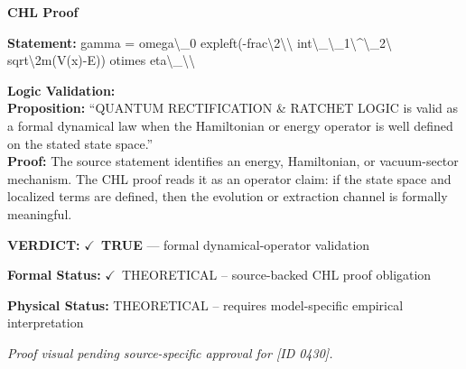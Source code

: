 \vspace{0.45em}
\noindent\textbf{CHL Proof}\par
\textbf{Statement:} gamma = omega\textbackslash{}\_0 expleft(-frac\textbackslash{}2\textbackslash{}\textbackslash{} int\textbackslash{}\_\textbackslash{}\_1\textbackslash{}\textasciicircum{}\textbackslash{}\_2\textbackslash{} sqrt\textbackslash{}2m(V(x)-E)) otimes eta\textbackslash{}\_\textbackslash{}\textbackslash{}

\textbf{Logic Validation:}\\
\textbf{Proposition:} ``QUANTUM RECTIFICATION \& RATCHET LOGIC is valid as a formal dynamical law when the
Hamiltonian or energy operator is well defined on the stated state space.''\\
\textbf{Proof:} The source statement identifies an energy, Hamiltonian, or vacuum-sector mechanism. The
CHL proof reads it as an operator claim: if the state space and localized terms are
defined, then the evolution or extraction channel is formally meaningful.

\textbf{VERDICT:} \ensuremath{\checkmark}\ \textbf{TRUE} --- formal dynamical-operator validation

\textbf{Formal Status:} \ensuremath{\checkmark}\ THEORETICAL -- source-backed CHL proof obligation

\textbf{Physical Status:} THEORETICAL -- requires model-specific empirical interpretation
\par\vspace{0.45em}
\par
\vfill
\begingroup\footnotesize\itshape
Proof visual pending source-specific approval for [ID 0430].
\par\endgroup
\vfill
\endgroup
\endgroup
